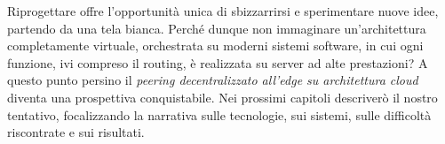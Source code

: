 Riprogettare offre l'opportunità unica di sbizzarrirsi e sperimentare nuove idee, partendo da una tela bianca. Perché dunque non immaginare un'architettura completamente virtuale, orchestrata su moderni sistemi software, in cui ogni funzione, ivi compreso il routing, è realizzata su server ad alte prestazioni? A questo punto persino il \textit{peering decentralizzato all'edge su architettura cloud} diventa una prospettiva conquistabile. Nei prossimi capitoli descriverò il nostro tentativo, focalizzando la narrativa sulle tecnologie, sui sistemi, sulle difficoltà riscontrate e sui risultati.